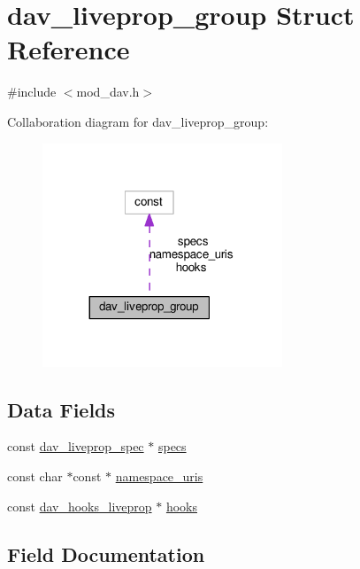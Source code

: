 \hypertarget{structdav__liveprop__group}{}\section{dav\+\_\+liveprop\+\_\+group Struct Reference}
\label{structdav__liveprop__group}


{\ttfamily \#include $<$mod\+\_\+dav.\+h$>$}



Collaboration diagram for dav\+\_\+liveprop\+\_\+group\+:
\nopagebreak
\begin{figure}[H]
\begin{center}
\leavevmode
\includegraphics[width=203pt]{structdav__liveprop__group__coll__graph}
\end{center}
\end{figure}
\subsection*{Data Fields}
\begin{DoxyCompactItemize}
\item 
const \hyperlink{structdav__liveprop__spec}{dav\+\_\+liveprop\+\_\+spec} $\ast$ \hyperlink{structdav__liveprop__group_afc73cae0d952870764fd8c0e9cb03907}{specs}
\item 
const char $\ast$const $\ast$ \hyperlink{structdav__liveprop__group_a6139603da47002c85469892051764b20}{namespace\+\_\+uris}
\item 
const \hyperlink{structdav__hooks__liveprop}{dav\+\_\+hooks\+\_\+liveprop} $\ast$ \hyperlink{structdav__liveprop__group_a1f5011b88b2fde463a2b1e19fa4f4243}{hooks}
\end{DoxyCompactItemize}


\subsection{Field Documentation}
